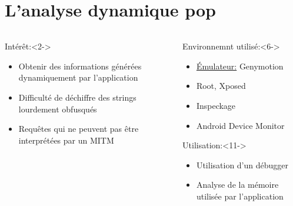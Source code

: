 \documentclass[aspectratio=1610, handout]{beamer}%
\begin{document}

 \section{L'analyse dynamique pop}
\begin{frame}
  \slidetitle[]
  \begin{columns}
    \begin{column}{0.48\linewidth}
      \begin{block}{Intérêt:}<2->
        \begin{itemize}
        \item<3-> Obtenir des informations générées dynamiquement par l'application
        \item<4-> Difficulté de déchiffre des strings lourdement obfusqués
        \item<5-> Requêtes qui ne peuvent pas être interprétées par un MITM
        \end{itemize}
      \end{block}
    \end{column}
    \begin{column}{0.48\linewidth}
      \begin{block}{Environnemnt utilisé:}<6->
        \begin{itemize}
        \item<7-> \uline{Émulateur:} Genymotion
        \item<8-> Root, Xposed
        \item<9-> Inspeckage
        \item<10-> Android Device Monitor
        \end{itemize}
      \end{block}
      \begin{block}{Utilisation:}<11->
        \begin{itemize}
        \item<12-> Utilisation d'un débugger
        \item<13-> Analyse de la mémoire utilisée par l'application
      \end{itemize}
      \end{block}
    \end{column}
  \end{columns}
\end{frame}
\end{document}
